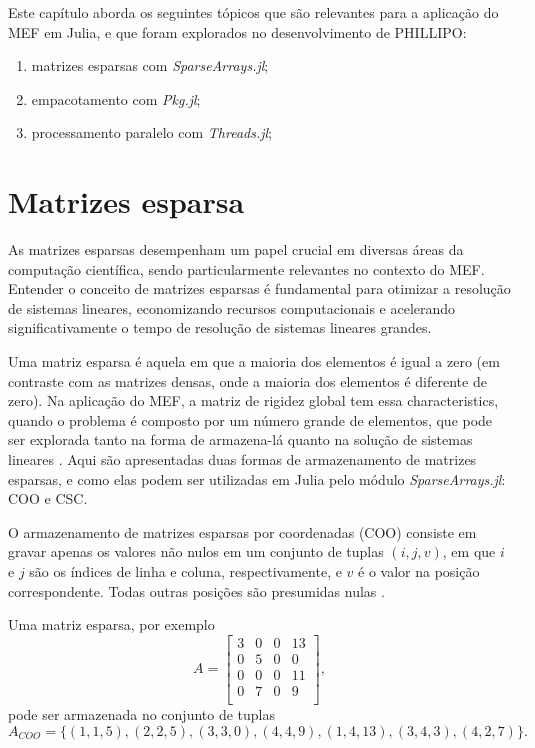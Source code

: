 Este capítulo aborda os seguintes tópicos que são relevantes para a aplicação do MEF em Julia, e que foram explorados no desenvolvimento de PHILLIPO:

\begin{enumerate}
    \item matrizes esparsas com \emph{SparseArrays.jl};
    \item empacotamento com \emph{Pkg.jl};
    \item processamento paralelo com \emph{Threads.jl};
\end{enumerate}



\section{Matrizes esparsa}

As matrizes esparsas desempenham um papel crucial em diversas áreas da computação científica, sendo particularmente relevantes no contexto do MEF. Entender o conceito de matrizes esparsas é fundamental para otimizar a resolução de sistemas lineares, economizando recursos computacionais e acelerando significativamente o tempo de resolução de sistemas lineares grandes.

Uma matriz esparsa é aquela em que a maioria dos elementos é igual a zero (em contraste com as matrizes densas, onde a maioria dos elementos é diferente de zero). Na aplicação do MEF, a matriz de rigidez global tem essa characteristics, quando o problema é composto por um número grande de elementos, que pode ser explorada tanto na forma de armazena-lá quanto na solução de sistemas lineares \cite{LOGAN}. Aqui são apresentadas duas formas de armazenamento de matrizes esparsas, e como elas podem ser utilizadas em Julia pelo módulo \emph{SparseArrays.jl}: COO e CSC.


O armazenamento de matrizes esparsas por coordenadas (COO) consiste em gravar apenas os valores não nulos em um conjunto de tuplas $(i, j, v)$, em que $i$ e $j$ são os índices de linha e coluna, respectivamente, e $v$ é o valor na posição correspondente. Todas outras posições são presumidas nulas \cite{sparse}. 

Uma matriz esparsa, por exemplo
\begin{equation}
    A = 
    \begin{bmatrix}
        3 & 0 & 0 & 13 \\
        0 & 5 & 0 & 0 \\
        0 & 0 & 0 & 11 \\
        0 & 7 & 0 & 9 \\
    \end{bmatrix},
    \label{eq:coo_matrix}
\end{equation}
pode ser armazenada no conjunto de tuplas
\begin{equation}
    A_{COO} = \{(1,1,5), (2,2,5), (3,3,0), (4,4,9), (1,4,13), (3,4,3), (4,2,7)\}.
    \label{eq:coo}
\end{equation}


